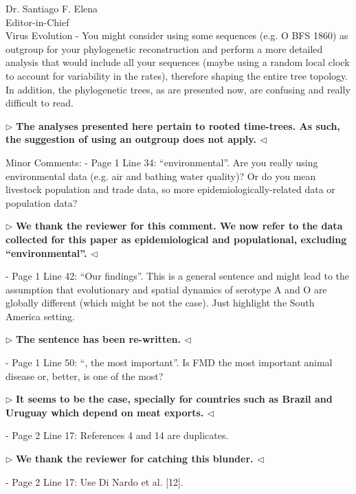 \documentclass[ucla,biomath,12pt,noaddrfooter,datefrom]{UC_letter}
\newenvironment{reply}{$\triangleright$\bf}{$\triangleleft$}
\begin{document}
\begin{letter}{
Dr. Santiago F. Elena \\
Editor-in-Chief \\
Virus Evolution
}
-       You might consider using some sequences (e.g. O BFS 1860) as outgroup for your phylogenetic reconstruction and perform a more detailed analysis that would include all your sequences (maybe using a random local clock to account for variability in the rates), therefore shaping the entire tree topology. 
In addition, the phylogenetic trees, as are presented now, are confusing and really difficult to read.

\begin{reply}
The analyses presented here pertain to rooted time-trees. 
As such, the suggestion of using an outgroup does not apply.
\end{reply}

Minor Comments:
-       Page 1 Line 34: ``environmental''. 
Are you really using environmental data (e.g. air and bathing water quality)? 
Or do you mean livestock population and trade data, so more epidemiologically-related data or population data?

\begin{reply}
We thank the reviewer for this comment.
We now  refer to the data collected for this paper as epidemiological and populational, excluding ``environmental''.
\end{reply}

-       Page 1 Line 42: ``Our findings''. 
This is a general sentence and might lead to the assumption that evolutionary and spatial dynamics of serotype A and O are globally different (which might be not the case). 
Just highlight the South America setting.

\begin{reply}
The sentence has been re-written.
\end{reply}

-       Page 1 Line 50: ``, the most important''. 
Is FMD the most important animal disease or, better, is one of the most?

\begin{reply}
It seems to be the case, specially for countries such as Brazil and Uruguay which depend on meat exports.
\end{reply}

-       Page 2 Line 17: References 4 and 14 are duplicates.

\begin{reply}
We thank the reviewer for catching this blunder.
\end{reply}

-       Page 2 Line 17: Use Di Nardo et al. [12].


\end{letter}
\end{document}

